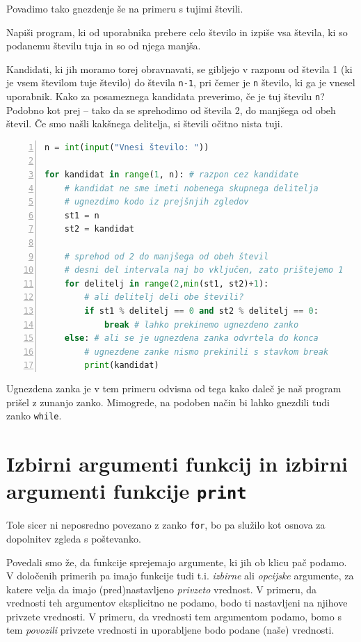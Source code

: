 Povadimo tako gnezdenje še na primeru s tujimi števili.
\begin{zgled}
Napiši program, ki od uporabnika prebere celo število in izpiše vsa števila, ki so podanemu številu tuja in so od njega manjša. 
\end{zgled}
\begin{resitev}
Kandidati, ki jih moramo torej obravnavati, se gibljejo v razponu od števila 1 (ki je vsem številom tuje število) do števila \texttt{n-1}, pri čemer je \texttt{n} število, ki ga je vnesel uporabnik. Kako za posameznega kandidata preverimo, če je tuj številu \texttt{n}? Podobno kot prej -- tako da se sprehodimo od števila 2, do manjšega od obeh števil. Če smo našli kakšnega delitelja, si števili očitno nista tuji.
\begin{lstlisting}[language=Python,numbers=left]
n = int(input("Vnesi število: "))

for kandidat in range(1, n): # razpon cez kandidate
    # kandidat ne sme imeti nobenega skupnega delitelja
    # ugnezdimo kodo iz prejšnjih zgledov
    st1 = n
    st2 = kandidat
    
    # sprehod od 2 do manjšega od obeh števil
    # desni del intervala naj bo vključen, zato prištejemo 1
    for delitelj in range(2,min(st1, st2)+1):
        # ali delitelj deli obe števili?
        if st1 % delitelj == 0 and st2 % delitelj == 0:
            break # lahko prekinemo ugnezdeno zanko
    else: # ali se je ugnezdena zanka odvrtela do konca
        # ugnezdene zanke nismo prekinili s stavkom break
        print(kandidat)
\end{lstlisting}
\end{resitev}
Ugnezdena zanka je v tem primeru odvisna od tega kako daleč je naš program prišel z zunanjo zanko. Mimogrede, na podoben način bi lahko gnezdili tudi zanko \texttt{while}. 


\section{Izbirni argumenti funkcij in izbirni argumenti funkcije \texttt{print}}

Tole sicer ni neposredno povezano z zanko \texttt{for}, bo pa služilo kot osnova za dopolnitev zgleda s poštevanko. 

Povedali smo že, da funkcije sprejemajo argumente, ki jih ob klicu pač podamo. V določenih primerih pa imajo funkcije tudi t.i. \emph{izbirne} ali \emph{opcijske} argumente, za katere velja da imajo (pred)nastavljeno \emph{privzeto} vrednost. V primeru, da vrednosti teh argumentov eksplicitno ne podamo, bodo ti nastavljeni na njihove privzete vrednosti. V primeru, da vrednosti tem argumentom podamo, bomo s tem \emph{povozili} privzete vrednosti in uporabljene bodo podane (naše) vrednosti.

